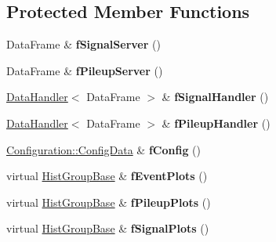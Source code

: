 \subsection*{Protected Member Functions}
\begin{CompactItemize}
\item 
\hypertarget{classUserAnalysisBase_2f0cd8cc51a5001ee7ebe60d17e5768f}{
Data\-Frame \& \textbf{f\-Signal\-Server} ()}
\label{classUserAnalysisBase_2f0cd8cc51a5001ee7ebe60d17e5768f}

\item 
\hypertarget{classUserAnalysisBase_1dc909ca28b818ce380ac61f88b3959d}{
Data\-Frame \& \textbf{f\-Pileup\-Server} ()}
\label{classUserAnalysisBase_1dc909ca28b818ce380ac61f88b3959d}

\item 
\hypertarget{classUserAnalysisBase_79f854dd0e6cf0c662c93df54707da6c}{
\hyperlink{structDataHandler}{Data\-Handler}$<$ Data\-Frame $>$ \& \textbf{f\-Signal\-Handler} ()}
\label{classUserAnalysisBase_79f854dd0e6cf0c662c93df54707da6c}

\item 
\hypertarget{classUserAnalysisBase_6aefe1fef892838afd71a7a7de4b7ca7}{
\hyperlink{structDataHandler}{Data\-Handler}$<$ Data\-Frame $>$ \& \textbf{f\-Pileup\-Handler} ()}
\label{classUserAnalysisBase_6aefe1fef892838afd71a7a7de4b7ca7}

\item 
\hypertarget{classUserAnalysisBase_09b07326b304bc2b9d3427de0d51bccd}{
\hyperlink{classConfiguration_1_1ConfigData}{Configuration::Config\-Data} \& \textbf{f\-Config} ()}
\label{classUserAnalysisBase_09b07326b304bc2b9d3427de0d51bccd}

\item 
\hypertarget{classUserAnalysisBase_d24e1cf2438ed953aa549ab7157a8709}{
virtual \hyperlink{classHistGroupBase}{Hist\-Group\-Base} \& \textbf{f\-Event\-Plots} ()}
\label{classUserAnalysisBase_d24e1cf2438ed953aa549ab7157a8709}

\item 
\hypertarget{classUserAnalysisBase_6b6262cfde06a542fd67c380558eb63c}{
virtual \hyperlink{classHistGroupBase}{Hist\-Group\-Base} \& \textbf{f\-Pileup\-Plots} ()}
\label{classUserAnalysisBase_6b6262cfde06a542fd67c380558eb63c}

\item 
\hypertarget{classUserAnalysisBase_01b769d0c33ce10ee700f8eb71ba23e5}{
virtual \hyperlink{classHistGroupBase}{Hist\-Group\-Base} \& \textbf{f\-Signal\-Plots} ()}
\label{classUserAnalysisBase_01b769d0c33ce10ee700f8eb71ba23e5}


\end{CompactItemize}
